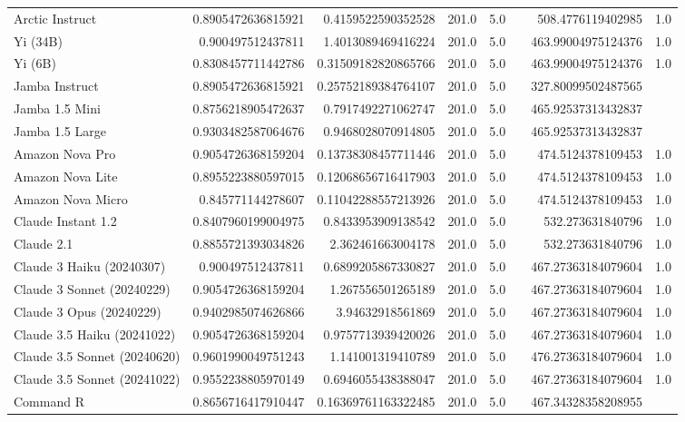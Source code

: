 \begin{table}[htp]
{\begin{tabular}{lrrrrrrr}
Arctic Instruct & 0.8905472636815921 & 0.4159522590352528 & 201.0 & 5.0 &  & 508.4776119402985 & 1.0 \\
Yi (34B) & 0.900497512437811 & 1.4013089469416224 & 201.0 & 5.0 &  & 463.99004975124376 & 1.0 \\
Yi (6B) & 0.8308457711442786 & 0.31509182820865766 & 201.0 & 5.0 &  & 463.99004975124376 & 1.0 \\
Jamba Instruct & 0.8905472636815921 & 0.25752189384764107 & 201.0 & 5.0 &  & 327.80099502487565 &  \\
Jamba 1.5 Mini & 0.8756218905472637 & 0.7917492271062747 & 201.0 & 5.0 &  & 465.92537313432837 &  \\
Jamba 1.5 Large & 0.9303482587064676 & 0.9468028070914805 & 201.0 & 5.0 &  & 465.92537313432837 &  \\
Amazon Nova Pro & 0.9054726368159204 & 0.13738308457711446 & 201.0 & 5.0 &  & 474.5124378109453 & 1.0 \\
Amazon Nova Lite & 0.8955223880597015 & 0.12068656716417903 & 201.0 & 5.0 &  & 474.5124378109453 & 1.0 \\
Amazon Nova Micro & 0.845771144278607 & 0.11042288557213926 & 201.0 & 5.0 &  & 474.5124378109453 & 1.0 \\
Claude Instant 1.2 & 0.8407960199004975 & 0.8433953909138542 & 201.0 & 5.0 &  & 532.273631840796 & 1.0 \\
Claude 2.1 & 0.8855721393034826 & 2.362461663004178 & 201.0 & 5.0 &  & 532.273631840796 & 1.0 \\
Claude 3 Haiku (20240307) & 0.900497512437811 & 0.6899205867330827 & 201.0 & 5.0 &  & 467.27363184079604 & 1.0 \\
Claude 3 Sonnet (20240229) & 0.9054726368159204 & 1.267556501265189 & 201.0 & 5.0 &  & 467.27363184079604 & 1.0 \\
Claude 3 Opus (20240229) & 0.9402985074626866 & 3.94632918561869 & 201.0 & 5.0 &  & 467.27363184079604 & 1.0 \\
Claude 3.5 Haiku (20241022) & 0.9054726368159204 & 0.9757713939420026 & 201.0 & 5.0 &  & 467.27363184079604 & 1.0 \\
Claude 3.5 Sonnet (20240620) & 0.9601990049751243 & 1.141001319410789 & 201.0 & 5.0 &  & 476.27363184079604 & 1.0 \\
Claude 3.5 Sonnet (20241022) & 0.9552238805970149 & 0.6946055438388047 & 201.0 & 5.0 &  & 467.27363184079604 & 1.0 \\
Command R & 0.8656716417910447 & 0.16369761163322485 & 201.0 & 5.0 &  & 467.34328358208955 &  \\

\end{tabular}}
\end{table}
